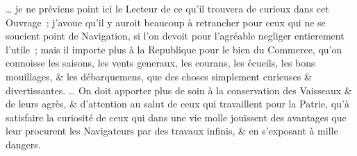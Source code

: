 \documentclass[11pt,twoside,openany]{book}
\newenvironment{lateiDocument}{}{}
\begin{document}
\begin{lateiDocument}
\begin{teiElement}[name={TEI},change={commons\_edition}]
\begin{teiElement}[name={text},type={book},xmlid={book}]
\begin{teiElement}[name={group},type={book},xmlid={book-001}]
\begin{teiElement}[name={group},type={section1},xmlid={section1-003}]
\begin{teiElement}
\begin{teiElement}[name={body},xmlid={body-010}]
\begin{teiDiv}[type={section1},xmlid={div01-9}]
\begin{teiCit}[xmlid={cit04-7}]
                \begin{teiQuote}
\lbrack{}…\rbrack{} je ne préviens point ici le Lecteur de ce qu’il trouvera de curieux dans cet Ouvrage ; j’avoue qu’il y auroit beaucoup à retrancher pour ceux qui ne se soucient point de Navigation, si l’on devoit pour l’agréable negliger entierement l’utile ; mais il importe plus à la Republique pour le bien du Commerce, qu’on connoisse les saisons, les vents generaux, les courans, les écueils, les bons mouillages, \& les débarquemens, que des choses simplement curieuses \& divertissantes. \lbrack{}…\rbrack{} On doit apporter plus de soin à la conservation des Vaisseaux \& de leurs agrès, \& d’attention au salut de ceux qui travaillent pour la Patrie, qu’à satisfaire la curiosité de ceux qui dans une vie molle jouïssent des avantages que leur procurent les Navigateurs par des travaux infinis, \& en s’exposant à mille dangers.
\end{teiQuote}
              

\end{teiCit}
\end{teiDiv}
\end{teiElement}
\end{teiElement}
\end{teiElement}
\end{teiElement}
\end{teiElement}
\end{teiElement}
\end{lateiDocument}
\end{document}
